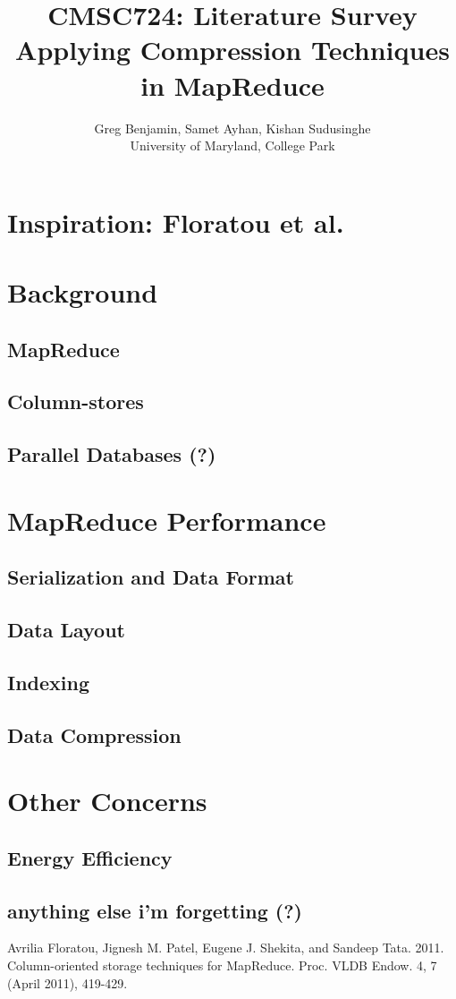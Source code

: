 \documentclass[twocolumn]{article}
\title{CMSC724: Literature Survey \\
Applying Compression Techniques in MapReduce}
\author{Greg Benjamin, Samet Ayhan, Kishan Sudusinghe \\
University of Maryland, College Park}
\date{}
\begin{document}
\maketitle

\section{Inspiration: Floratou et al.}

\section{Background}
\subsection{MapReduce}
\subsection{Column-stores}
\subsection{Parallel Databases (?)}

\section{MapReduce Performance}
\subsection{Serialization and Data Format}
\subsection{Data Layout}
\subsection{Indexing}
\subsection{Data Compression}

\section{Other Concerns}
\subsection{Energy Efficiency}
\subsection{anything else i'm forgetting (?)}

\begin{thebibliography}{10}

 Avrilia Floratou, Jignesh M. Patel, Eugene J. Shekita, and Sandeep
	Tata. 2011. Column-oriented storage techniques for MapReduce.
	Proc. VLDB Endow. 4, 7 (April 2011), 419-429.

\end{thebibliography}
\end{document}
